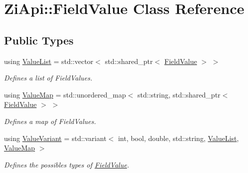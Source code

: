 \hypertarget{classZiApi_1_1FieldValue}{}\section{Zi\+Api\+::Field\+Value Class Reference}
\label{classZiApi_1_1FieldValue}
\subsection*{Public Types}
\begin{DoxyCompactItemize}
\item 
\mbox{\label{classZiApi_1_1FieldValue_a7ce9d872b19e8f9818f51398e49ca2a0}} 
using \mbox{\hyperlink{classZiApi_1_1FieldValue_a7ce9d872b19e8f9818f51398e49ca2a0}{Value\+List}} = std\+::vector$<$ std\+::shared\+\_\+ptr$<$ \mbox{\hyperlink{classZiApi_1_1FieldValue}{Field\+Value}} $>$ $>$
\begin{DoxyCompactList}\small\item\em Defines a list of Field\+Values. \end{DoxyCompactList}\item 
\mbox{\label{classZiApi_1_1FieldValue_ad8dd32464e75289185e2d8260cb3672d}} 
using \mbox{\hyperlink{classZiApi_1_1FieldValue_ad8dd32464e75289185e2d8260cb3672d}{Value\+Map}} = std\+::unordered\+\_\+map$<$ std\+::string, std\+::shared\+\_\+ptr$<$ \mbox{\hyperlink{classZiApi_1_1FieldValue}{Field\+Value}} $>$ $>$
\begin{DoxyCompactList}\small\item\em Defines a map of Field\+Values. \end{DoxyCompactList}\item 
\mbox{\label{classZiApi_1_1FieldValue_aa05c96baba965d0ad1cd54c7878f4450}} 
using \mbox{\hyperlink{classZiApi_1_1FieldValue_aa05c96baba965d0ad1cd54c7878f4450}{Value\+Variant}} = std\+::variant$<$ int, bool, double, std\+::string, \mbox{\hyperlink{classZiApi_1_1FieldValue_a7ce9d872b19e8f9818f51398e49ca2a0}{Value\+List}}, \mbox{\hyperlink{classZiApi_1_1FieldValue_ad8dd32464e75289185e2d8260cb3672d}{Value\+Map}} $>$
\begin{DoxyCompactList}\small\item\em Defines the possibles types of \mbox{\hyperlink{classZiApi_1_1FieldValue}{Field\+Value}}. \end{DoxyCompactList}\end{DoxyCompactItemize}
